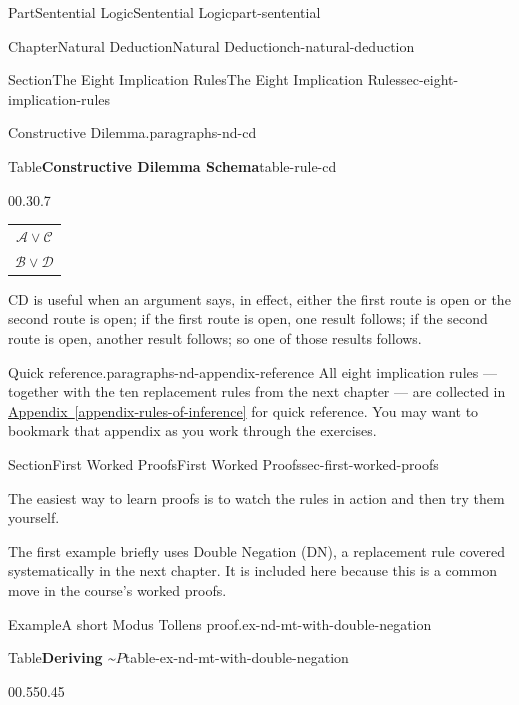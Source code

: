 \documentclass[oneside,10pt,]{book}
\newcommand{\tabularfont}{\relax}
\newcommand{\xreffont}{\relax}
\newcommand{\hrulemedium}{\noalign{\hrule height 0.07em}}
\begin{document}
\begin{partptx}{Part}{Sentential Logic}{}{Sentential Logic}{}{}{part-sentential}
\begin{chapterptx}{Chapter}{Natural Deduction}{}{Natural Deduction}{}{}{ch-natural-deduction}
\begin{sectionptx}{Section}{The Eight Implication Rules}{}{The Eight Implication Rules}{}{}{sec-eight-implication-rules}
\begin{paragraphs}{Constructive Dilemma.}{paragraphs-nd-cd}
\begin{tableptx}{Table}{\textbf{Constructive Dilemma Schema}}{table-rule-cd}{}
\begin{tabularbox}{0}{0.3}{0.7}
{{\begin{tabular}{c}
\(\mathcal{A} \lor \mathcal{C}\)\tabularnewline\hrulemedium
\(\mathcal{B} \lor \mathcal{D}\)
\end{tabular}
}%
}%
\end{tabularbox}%
\end{tableptx}%
CD is useful when an argument says, in effect, either the first route is open or the second route is open; if the first route is open, one result follows; if the second route is open, another result follows; so one of those results follows.%
\end{paragraphs}%
\begin{paragraphs}{Quick reference.}{paragraphs-nd-appendix-reference}%
All eight implication rules — together with the ten replacement rules from the next chapter — are collected in \hyperref[appendix-rules-of-inference]{Appendix~{\xreffont\ref{appendix-rules-of-inference}}} for quick reference. You may want to bookmark that appendix as you work through the exercises.%
\end{paragraphs}%
\end{sectionptx}
%
%
\typeout{************************************************}
\typeout{************************************************}
%
\begin{sectionptx}{Section}{First Worked Proofs}{}{First Worked Proofs}{}{}{sec-first-worked-proofs}
\begin{introduction}{}%
The easiest way to learn proofs is to watch the rules in action and then try them yourself.%
\par
The first example briefly uses Double Negation (DN), a replacement rule covered systematically in the next chapter. It is included here because this is a common move in the course's worked proofs.%
\end{introduction}%
\begin{example}{Example}{A short Modus Tollens proof.}{ex-nd-mt-with-double-negation}%
\begin{tableptx}{Table}{\textbf{Deriving \({\text{\textasciitilde}}P\)}}{table-ex-nd-mt-with-double-negation}{}%
\begin{tabularbox}{0}{0.55}{0.45}%
\resizebox{\ifdim\width > \linewidth\linewidth\else\width\fi}{!}{%
{\tabularfont%
\begin{tabular}{lll}
1.&\(P \supset {\text{\textasciitilde}}S\)&\tabularnewline[0pt]
2.&\(S\)&\slash{} \({\text{\textasciitilde}}P\)\tabularnewline[0pt]
3.&\({\text{\textasciitilde}}{\text{\textasciitilde}}S\)&2 DN\tabularnewline[0pt]

\end{tabular}}}
\end{tabularbox}
\end{tableptx}
\end{example}
\end{sectionptx}
\end{chapterptx}
\end{partptx}
\end{document}
